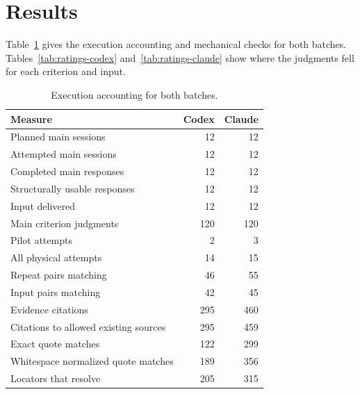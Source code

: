 \documentclass[10pt,conference]{IEEEtran}
\begin{document}
\section{Results}
Table~\ref{tab:execution} gives the execution accounting and mechanical checks for both batches. Tables~\ref{tab:ratings-codex} and~\ref{tab:ratings-claude} show where the judgments fell for each criterion and input.
\begin{table}[t]
\caption{Execution accounting for both batches.}
\label{tab:execution}
\centering\begin{tabular}{lrr}\toprule
Measure & Codex & Claude \\
\midrule
Planned main sessions & 12 & 12 \\
Attempted main sessions & 12 & 12 \\
Completed main responses & 12 & 12 \\
Structurally usable responses & 12 & 12 \\
Input delivered & 12 & 12 \\
Main criterion judgments & 120 & 120 \\
Pilot attempts & 2 & 3 \\
All physical attempts & 14 & 15 \\
Repeat pairs matching & 46 & 55 \\
Input pairs matching & 42 & 45 \\
Evidence citations & 295 & 460 \\
Citations to allowed existing sources & 295 & 459 \\
Exact quote matches & 122 & 299 \\
Whitespace normalized quote matches & 189 & 356 \\
Locators that resolve & 205 & 315 \\
\bottomrule\end{tabular}
\end{table}
\end{document}
